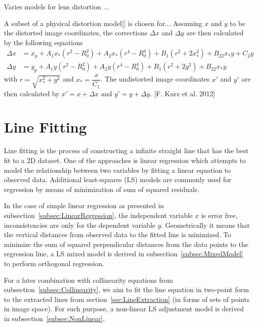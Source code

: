 Varies models for lens distortion ...

A subset of a physical distortion model[] is chosen for...
Assuming $x$ and $y$ to be the distorted image coordinates, the corrections $\Delta x$ and $\Delta y$ are then calculated by the following equations
\begin{equation} %
\begin{split}
\Delta x &= x_p + A_1x_*(r^2-R_0^2) + A_2x_*(r^4-R_0^4) + B_1(r^2+2x_*^2) + B_22x_*y+C_2y \\
\Delta y &= y_p + A_1y  (r^2-R_0^2) + A_2y  (r^4-R_0^4) + B_1(r^2+2y^2)   + B_22x_*y
\end{split}
\end{equation}
with $r=\sqrt{x_*^2+y^2}$ and $x_*=\dfrac{x}{C_1}$. The undistorted image coordinates $x\prime$ and $y\prime$ are then calculated by $x\prime=x+\Delta x$ and $y\prime=y+\Delta y$. [F. Kurz et al. 2012] 







\section{Line Fitting}
\label{sec:LineFitting}

Line fitting is the process of constructing a infinite straight line that has the best fit to a 2D dataset. One of the approaches is linear regression which attempts to model the relationship between two variables by fitting a linear equation to observed data. %
Additional least-squares (LS) models are commonly used for regression by means of minimization of sum of squared residuals.

In the case of simple linear regression as presented in subsection~\ref{subsec:LinearRegression}, the independent variable $x$ is error free, inconsistencies are only for the dependent variable $y$. Geometrically it means that the vertical distances from observed data to the fitted line is minimized. To minimize the sum of squared perpendicular distances from the data points to the regression line, a LS mixed model is derived in subsection~\ref{subsec:MixedModel} to perform orthogonal regression.

For a later combination with collinearity equations from subsection~\ref{subsec:Collinearity}, we aim to fit the line equation in two-point form to the extracted lines from section~\ref{sec:LineExtraction} (in forms of sets of points in image space). For such purpose, a non-linear LS adjustment model is derived in subsection~\ref{subsec:NonLinear}. 


